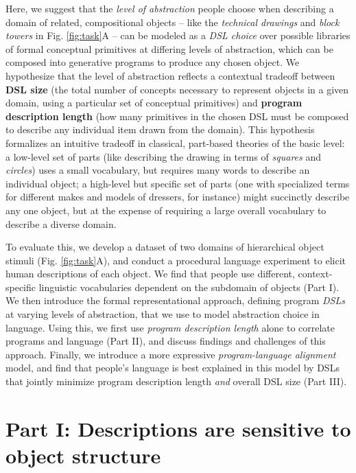 \documentclass[10pt,letterpaper]{article}
\begin{document}
Here, we suggest that the \textit{level of abstraction} people choose when describing a domain of related, compositional objects -- like the \textit{technical drawings} and \textit{block towers} in Fig. \ref{fig:task}A -- can be modeled as a \textit{DSL choice} over possible libraries of formal conceptual primitives at differing levels of abstraction, which can be composed into generative programs to produce any chosen object. We hypothesize that the level of abstraction reflects a contextual tradeoff between \textbf{DSL size} (the total number of concepts necessary to represent objects in a given domain, using a particular set of conceptual primitives) and \textbf{program description length} (how many primitives in the chosen DSL must be composed to describe any individual item drawn from the domain). This hypothesis formalizes an intuitive tradeoff in classical, part-based theories of the basic level: a low-level set of parts (like describing the drawing in terms of \textit{squares} and \textit{circles}) uses a small vocabulary, but requires  many words to describe an individual object; a high-level but specific set of parts (one with specialized terms for different makes and models of dressers, for instance) might succinctly describe any one object, but at the expense of requiring a large overall vocabulary to describe a diverse domain.

To evaluate this, we develop a dataset of two domains of hierarchical object stimuli (Fig. \ref{fig:task}A), and conduct a procedural language experiment to elicit human descriptions of each object. We find that people use different, context-specific linguistic vocabularies dependent on the subdomain of objects (Part I). We then introduce the formal representational approach, defining program \textit{DSLs} at varying levels of abstraction, that we use to model abstraction choice in language. Using this, we first use \textit{program description length} alone to correlate programs and language (Part II), and discuss findings and challenges of this approach. Finally, we introduce a more expressive \textit{program-language alignment} model, and find that people's language is best explained in this model by DSLs that jointly minimize program description length \textit{and} overall DSL size (Part III).

\section{Part I: Descriptions are sensitive to object structure} \label{sec-part-i}
\end{document}
